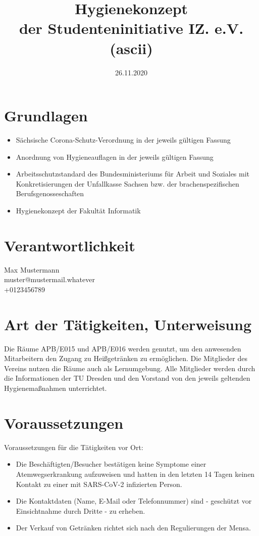 \documentclass[12pt]{article}
\title{Hygienekonzept\\der Studenteninitiative IZ. e.V. (ascii)}
\date{26.11.2020}
\author{}
\makeatletter
\newcommand*{\responsibleName}{Max Mustermann}
\newcommand*{\responsibleMail}{muster@mustermail.whatever}
\newcommand*{\responsiblePhone}{+0123456789}
\makeatother
\begin{document}
    \maketitle

    \section*{Grundlagen}
        \begin{itemize}
            \item Sächsische Corona-Schutz-Verordnung in der jeweils gültigen Fassung
            \item Anordnung von Hygieneauflagen in der jeweils gültigen Fassung
            \item Arbeitsschutzstandard des Bundesministeriums für Arbeit und Soziales mit Konkretisierungen der Unfallkasse Sachsen bzw. der brachenspezifischen Berufsgenosseschaften
            \item Hygienekonzept der Fakultät Informatik
        \end{itemize}

    \section*{Verantwortlichkeit}
        \responsibleName \\
        \responsibleMail \\
        \responsiblePhone

    \section{Art der Tätigkeiten, Unterweisung}
        Die Räume APB/E015 und APB/E016 werden genutzt, um den anwesenden Mitarbeitern den Zugang zu Heißgetränken zu ermöglichen.
        Die Mitglieder des Vereins nutzen die Räume auch als Lernumgebung.
        Alle Mitglieder werden durch die Informationen der TU Dresden und den Vorstand von den jeweils geltenden Hygienemaßnahmen unterrichtet.

    \section{Voraussetzungen}
        Voraussetzungen für die Tätigkeiten vor Ort:
        \begin{itemize}
            \item Die Beschäftigten/Besucher bestätigen keine Symptome einer Atemwegserkrankung aufzuweisen und hatten in den letzten 14 Tagen keinen Kontakt zu einer mit SARS-CoV-2 infizierten Person.
            \item Die Kontaktdaten (Name, E-Mail oder Telefonnummer) sind - geschützt vor Einsichtnahme durch Dritte - zu erheben.
            \item Der Verkauf von Getränken richtet sich nach den Regulierungen der Mensa.
        \end{itemize}
\end{document}
